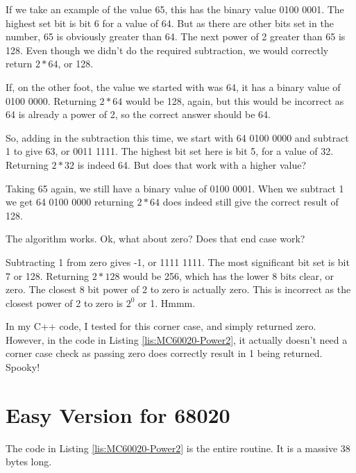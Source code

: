 If we take an example of the value 65, this has the binary value 0100
0001. The highest set bit is bit 6 for a value of 64. But as there
are other bits set in the number, 65 is obviously greater than 64.
The next power of 2 greater than 65 is 128. Even though we didn't
do the required subtraction, we would correctly return $2*64$, or
128.

If, on the other foot, the value we started with was 64, it has a
binary value of 0100 0000. Returning $2*64$ would be 128, again,
but this would be incorrect as 64 is already a power of 2, so the
correct answer should be 64.

So, adding in the subtraction this time, we start with 64 \textendash{}
0100 0000 \textendash{} and subtract 1 to give 63, or 0011 1111. The
highest bit set here is bit 5, for a value of 32. Returning $2*32$
is indeed 64. But does that work with a higher value?

Taking 65 again, we still have a binary value of 0100 0001. When we
subtract 1 we get 64 \textendash{} 0100 0000 \textendash{} returning
$2*64$ does indeed still give the correct result of 128.

The algorithm works. Ok, what about zero? Does that end case work?

Subtracting 1 from zero gives -1, or 1111 1111. The most significant
bit set is bit 7 or 128. Returning $2*128$ would be 256, which has
the lower 8 bits clear, or zero. The closest 8 bit power of 2 to zero
is actually zero. This is incorrect as the closest power of 2 to zero
is $2^{0}$ or 1. Hmmm.

In my C++ code, I tested for this corner case, and simply returned
zero. However, in the code in Listing \ref{lis:MC60020-Power2}, it
actually doesn't need a corner case check as passing zero does correctly
result in 1 being returned. Spooky!

\section{Easy Version for 68020}

The code in Listing \ref{lis:MC60020-Power2} is the entire routine.
It is a massive 38 bytes long.

